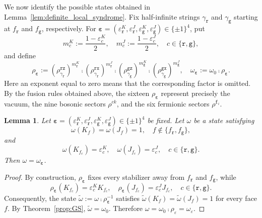 \documentclass[a4paper,11pt]{article}
\newtheorem{lemma}[theorem]{Lemma}
\theoremstyle{definition}
\theoremstyle{remark}
\theoremstyle{remark}
\begin{document}
We now identify the possible states obtained in Lemma~\ref{lem:definite_local_syndrome}. Fix half-infinite strings $\gamma_{\mathtt r}$ and $\gamma_{\mathtt g}$ starting at $f_{\mathtt r}$ and $f_{\mathtt g}$, respectively. For $\boldsymbol{\varepsilon}= (\varepsilon_{\mathtt r}^K,\varepsilon_{\mathtt r}^J,\varepsilon_{\mathtt g}^K,\varepsilon_{\mathtt g}^J)\in\{\pm1\}^4$, put
\[
    m_c^K:=\frac{1-\varepsilon_c^K}{2}, \quad m_c^J:=\frac{1-\varepsilon_c^J}{2}, \quad c\in\{\mathtt r,\mathtt g\},
\]
and define
\begin{equation*}
    \rho_{\boldsymbol{\varepsilon}} := \left(\rho_{\gamma_{\mathtt r}}^{\mathtt r\mathtt z}\right)^{m_{\mathtt r}^K} \comp \left(\rho_{\gamma_{\mathtt r}}^{\mathtt r\mathtt x}\right)^{m_{\mathtt r}^J} \comp \left(\rho_{\gamma_{\mathtt g}}^{\mathtt g\mathtt z}\right)^{m_{\mathtt g}^K} \comp \left(\rho_{\gamma_{\mathtt g}}^{\mathtt g\mathtt x}\right)^{m_{\mathtt g}^J},\quad \omega_{\boldsymbol{\varepsilon}} :=\omega_0\comp\rho_{\boldsymbol{\varepsilon}}.
\end{equation*}
Here an exponent equal to zero means that the corresponding factor is omitted. By the fusion rules obtained above, the sixteen $\rho_{\boldsymbol{\varepsilon}}$ represent precisely the vacuum, the nine bosonic sectors $\rho^{ck}$, and the six fermionic sectors
$\rho^{\mathtt f_i}$.

\begin{lemma}\label{lem:unique_anyon_syndrome}
    Let $\boldsymbol{\varepsilon}= (\varepsilon_{\mathtt r}^K,\varepsilon_{\mathtt r}^J,\varepsilon_{\mathtt g}^K,\varepsilon_{\mathtt g}^J)\in\{\pm1\}^4$ be fixed. Let $\omega$ be a state satisfying
    \[
        \omega(K_f)=\omega(J_f)=1, \quad f\notin\{f_{\mathtt r},f_{\mathtt g}\},
    \]
    and
    \[
        \omega(K_{f_c})=\varepsilon_c^K, \quad \omega(J_{f_c})=\varepsilon_c^J, \quad c\in\{\mathtt r,\mathtt g\}.
    \]
    Then $\omega=\omega_{\boldsymbol{\varepsilon}}$. 
\end{lemma}

\begin{proof}
    By construction, $\rho_{\boldsymbol{\varepsilon}}$ fixes every
    stabilizer away from $f_{\mathtt r}$ and $f_{\mathtt g}$, while
    \[
        \rho_{\boldsymbol{\varepsilon}}(K_{f_c}) = \varepsilon_c^K K_{f_c},
        \quad \rho_{\boldsymbol{\varepsilon}}(J_{f_c}) = \varepsilon_c^J J_{f_c}, \quad c\in\{\mathtt r,\mathtt g\}.
    \]
    Consequently, the state $\widetilde{\omega} := \omega\comp\rho_{\boldsymbol{\varepsilon}}^{-1}$ satisfies $\widetilde{\omega}(K_f) = \widetilde{\omega}(J_f) = 1$ for every face $f$. By Theorem~\ref{prop:GS}, $\widetilde{\omega}=\omega_0$. Therefore $\omega=\omega_0\comp\rho_\varepsilon=\omega_\varepsilon$.
\end{proof}
\end{document}
